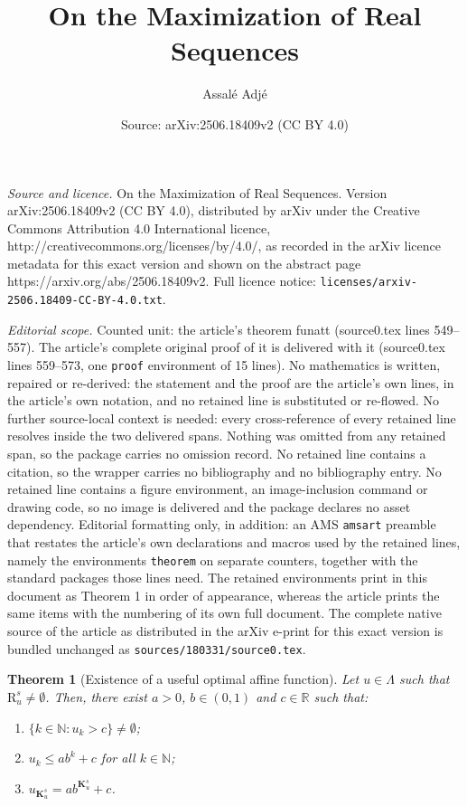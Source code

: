 \documentclass[10pt,a4paper]{amsart}
\title{On the Maximization of Real Sequences}
\author{Assal\'e Adj\'e}
\date{Source: arXiv:2506.18409v2 (CC BY 4.0)}
\newtheorem{theorem}{Theorem}
\def\bigks{\mathbf{K}^s}
\def\gls#1{{\mathrm R}_{#1}}
\def\gsls#1{\gls{#1}^s}
\def\nn{\mathbb N}
\def\rr{\mathbb R}
\begin{document}
\maketitle

\noindent\emph{Source and licence.} On the Maximization of Real Sequences. Version arXiv:2506.18409v2 (CC BY 4.0), distributed by arXiv under the Creative Commons Attribution 4.0 International licence, http://creativecommons.org/licenses/by/4.0/, as recorded in the arXiv licence metadata for this exact version and shown on the abstract page https://arxiv.org/abs/2506.18409v2. Full licence notice: \texttt{licenses/arxiv-2506.18409-CC-BY-4.0.txt}.\par\smallskip

\noindent\textit{Editorial scope.} Counted unit: the article's theorem funatt (source0.tex lines 549--557). The article's complete original proof of it is delivered with it (source0.tex lines 559--573, one \texttt{proof} environment of 15 lines). No mathematics is written, repaired or re-derived: the statement and the proof are the article's own lines, in the article's own notation, and no retained line is substituted or re-flowed.  No further source-local context is needed: every cross-reference of every retained line resolves inside the two delivered spans.  Nothing was omitted from any retained span, so the package carries no omission record.  No retained line contains a citation, so the wrapper carries no bibliography and no bibliography entry.  No retained line contains a figure environment, an image-inclusion command or drawing code, so no image is delivered and the package declares no asset dependency.  Editorial formatting only, in addition: an AMS \texttt{amsart} preamble that restates the article's own declarations and macros used by the retained lines, namely the environments \texttt{theorem} on separate counters, together with the standard packages those lines need.  The retained environments print in this document as Theorem 1 in order of appearance, whereas the article prints the same items with the numbering of its own full document.  The complete native source of the article as distributed in the arXiv e-print for this exact version is bundled unchanged as \texttt{sources/180331/source0.tex}.
	\begin{theorem}[Existence of a useful optimal affine function] 
		\label{funatt}
		Let $u\in\Lambda$ such that $\gsls{u}\neq \emptyset$. Then, there exist $a>0$, $b\in (0,1)$ and $c\in\rr$ such that:
		\begin{enumerate}
			\item $\{k\in\nn : u_k>c\}\neq \emptyset$;
			\item $u_k\leq a b^k+c$ for all $k\in\nn$;
			\item $u_{\bigks_u}=ab^{\bigks_u}+c$.
		\end{enumerate}
	\end{theorem}
\end{document}
